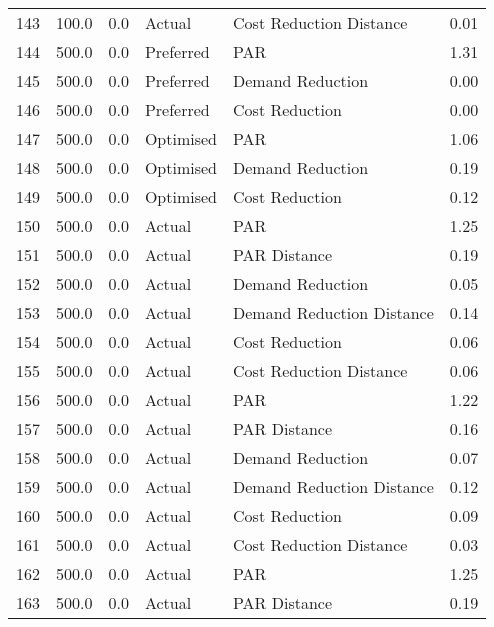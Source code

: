 \begin{longtable}{lrrllr}
143  &        100.0 &     0.0 &         Actual &    Cost Reduction Distance &   0.01 \\
144  &        500.0 &     0.0 &      Preferred &                        PAR &   1.31 \\
145  &        500.0 &     0.0 &      Preferred &           Demand Reduction &   0.00 \\
146  &        500.0 &     0.0 &      Preferred &             Cost Reduction &   0.00 \\
147  &        500.0 &     0.0 &      Optimised &                        PAR &   1.06 \\
148  &        500.0 &     0.0 &      Optimised &           Demand Reduction &   0.19 \\
149  &        500.0 &     0.0 &      Optimised &             Cost Reduction &   0.12 \\
150  &        500.0 &     0.0 &         Actual &                        PAR &   1.25 \\
151  &        500.0 &     0.0 &         Actual &               PAR Distance &   0.19 \\
152  &        500.0 &     0.0 &         Actual &           Demand Reduction &   0.05 \\
153  &        500.0 &     0.0 &         Actual &  Demand Reduction Distance &   0.14 \\
154  &        500.0 &     0.0 &         Actual &             Cost Reduction &   0.06 \\
155  &        500.0 &     0.0 &         Actual &    Cost Reduction Distance &   0.06 \\
156  &        500.0 &     0.0 &         Actual &                        PAR &   1.22 \\
157  &        500.0 &     0.0 &         Actual &               PAR Distance &   0.16 \\
158  &        500.0 &     0.0 &         Actual &           Demand Reduction &   0.07 \\
159  &        500.0 &     0.0 &         Actual &  Demand Reduction Distance &   0.12 \\
160  &        500.0 &     0.0 &         Actual &             Cost Reduction &   0.09 \\
161  &        500.0 &     0.0 &         Actual &    Cost Reduction Distance &   0.03 \\
162  &        500.0 &     0.0 &         Actual &                        PAR &   1.25 \\
163  &        500.0 &     0.0 &         Actual &               PAR Distance &   0.19 \\

\end{longtable}
